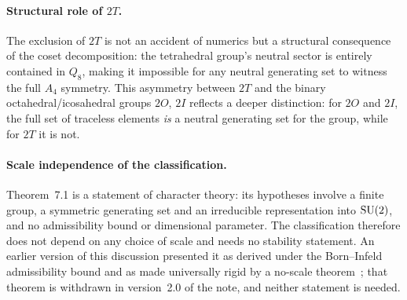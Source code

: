   \paragraph{Structural role of $2T$.}
    The exclusion of $2T$ is not an accident of numerics but a structural consequence of
    the coset decomposition: the tetrahedral group's neutral sector is entirely contained
    in $Q_8$, making it impossible for any neutral generating set to witness the full $A_4$
    symmetry.
    This asymmetry between $2T$ and the binary octahedral/icosahedral groups $2O$, $2I$
    reflects a deeper distinction: for $2O$ and $2I$, the full set of traceless elements
    \emph{is} a neutral generating set for the group, while for $2T$ it is not.

  \paragraph{Scale independence of the classification.}
    Theorem~7.1 is a statement of character theory: its hypotheses involve a finite group, a
    symmetric generating set and an irreducible representation into $\mathrm{SU}(2)$, and no admissibility
    bound or dimensional parameter.
    The classification therefore does not depend on any choice of scale and needs no stability
    statement.
    An earlier version of this discussion presented it as derived under the Born--Infeld admissibility
    bound and as made universally rigid by a no-scale theorem~\cite{NoScaleL1}; that theorem is
    withdrawn in version~2.0 of the note, and neither statement is needed.
